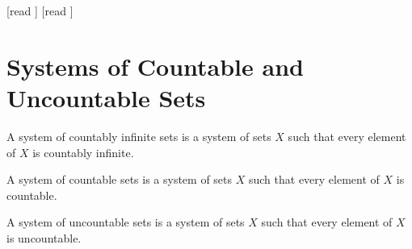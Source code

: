 \documentclass[10pt]{article}
\begin{document}
  \begin{imports}
    \begin{forthel}
      [read ]
      [read ]
    \end{forthel}
  \end{imports}


  \section*{Systems of Countable and Uncountable Sets}

  \begin{forthel}
    \begin{definition}[id=FOUNDATIONS_14_3786392159125504,printid]
      A system of countably infinite sets is a system of sets $X$ such that every element of $X$ is countably infinite.
    \end{definition}
  \end{forthel}

  \begin{forthel}
    \begin{definition}[id=FOUNDATIONS_14_7341152585908224,printid]
      A system of countable sets is a system of sets $X$ such that every element of $X$ is countable.
    \end{definition}
  \end{forthel}

  \begin{forthel}
    \begin{definition}[id=FOUNDATIONS_14_6106935677943808,printid]
      A system of uncountable sets is a system of sets $X$ such that every element of $X$ is uncountable.
    \end{definition}
  \end{forthel}
\end{document}

